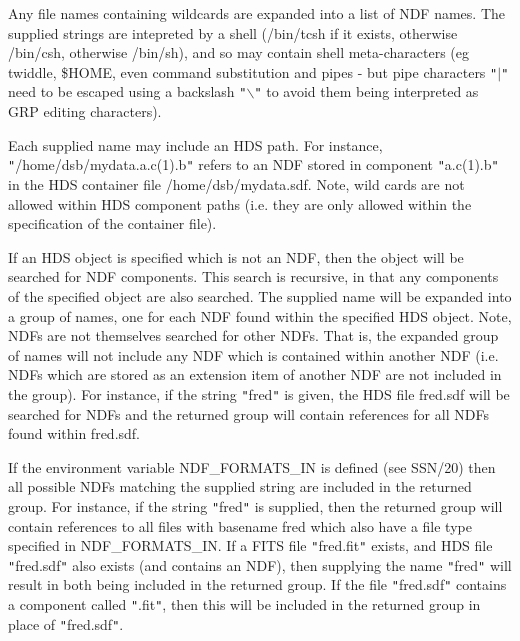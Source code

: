 {{{         \sstitem
         Any file names containing wildcards are expanded into a list of NDF
         names. The supplied strings are intepreted by a shell (/bin/tcsh if
         it exists, otherwise /bin/csh, otherwise /bin/sh), and so may
         contain shell meta-characters (eg twiddle, \$HOME, even command
         substitution and pipes - but pipe characters {\tt "}$|${\tt "} need to be escaped
         using a backslash {\tt "}$\backslash${\tt "} to avoid them being interpreted as GRP
         editing characters).

         \sstitem
         Each supplied name may include an HDS path. For instance,
         {\tt "}/home/dsb/mydata.a.c(1).b{\tt "} refers to an NDF stored in component
         {\tt "}a.c(1).b{\tt "} in the HDS container file /home/dsb/mydata.sdf. Note,
         wild cards are not allowed within HDS component paths (i.e. they
         are only allowed within the specification of the container file).

         \sstitem
         If an HDS object is specified which is not an NDF, then the
         object will be searched for NDF components. This search is
         recursive, in that any components of the specified object are also
         searched. The supplied name will be expanded into a group of names,
         one for each NDF found within the specified HDS object. Note, NDFs
         are not themselves searched for other NDFs. That is, the expanded
         group of names will not include any NDF which is contained within
         another NDF (i.e. NDFs which are stored as an extension item of
         another NDF are not included in the group). For instance, if the
         string {\tt "}fred{\tt "} is given, the HDS file fred.sdf will be searched for
         NDFs and the returned group will contain references for all NDFs
         found within fred.sdf.

         \sstitem
         If the environment variable NDF\_FORMATS\_IN is defined (see
         SSN/20) then all possible NDFs matching the supplied string are
         included in the returned group. For instance, if the string {\tt "}fred{\tt "}
         is supplied, then the returned group will contain references to all
         files with basename fred which also have a file type specified in
         NDF\_FORMATS\_IN. If a FITS file {\tt "}fred.fit{\tt "} exists, and HDS file
         {\tt "}fred.sdf{\tt "} also exists (and contains an NDF), then supplying the
         name {\tt "}fred{\tt "} will result in both being included in the returned
         group. If the file {\tt "}fred.sdf{\tt "} contains a component called {\tt "}.fit{\tt "},
         then this will be included in the returned group in place of
         {\tt "}fred.sdf{\tt "}.

}}}
